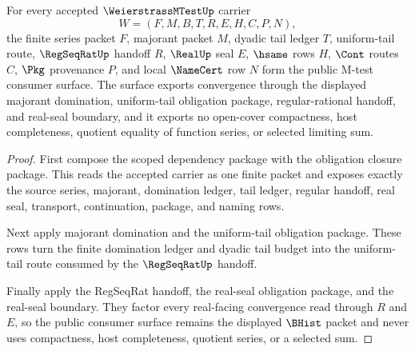 \begin{theorem}
\label{thm:weierstrass-mtest-public-convergence-export}
For every accepted $\WeierstrassMTestUp$ carrier
$$
W=(F,M,B,T,R,E,H,C,P,N),
$$
the finite series packet $F$, majorant packet $M$, dyadic tail ledger $T$, uniform-tail route, $\RegSeqRatUp$ handoff $R$, $\RealUp$ seal $E$, $\hsame$ rows $H$, $\Cont$ routes $C$, $\Pkg$ provenance $P$, and local $\NameCert$ row $N$ form the public M-test consumer surface. The surface exports convergence through the displayed majorant domination, uniform-tail obligation package, regular-rational handoff, and real-seal boundary, and it exports no open-cover compactness, host completeness, quotient equality of function series, or selected limiting sum.
\end{theorem}
\begin{proof}
First compose the scoped dependency package with the obligation closure package. This reads the accepted carrier as one finite packet and exposes exactly the source series, majorant, domination ledger, tail ledger, regular handoff, real seal, transport, continuation, package, and naming rows.

Next apply majorant domination and the uniform-tail obligation package. These rows turn the finite domination ledger and dyadic tail budget into the uniform-tail route consumed by the $\RegSeqRatUp$ handoff.

Finally apply the RegSeqRat handoff, the real-seal obligation package, and the real-seal boundary. They factor every real-facing convergence read through $R$ and $E$, so the public consumer surface remains the displayed $\BHist$ packet and never uses compactness, host completeness, quotient series, or a selected sum.
\end{proof}

